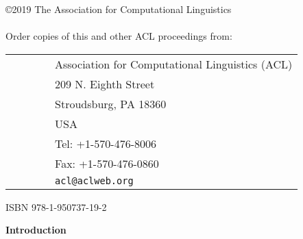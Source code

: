 \documentclass[a4paper,11pt,oneside]{book}
\begin{document}
\vspace*{3.5in}
\large
\noindent
\copyright 2019 The Association for Computational Linguistics\\
\hspace*{6.5mm} \\

\vspace*{0.6in}
\noindent Order copies of this and other ACL proceedings from: \\
\vspace*{3mm}

\begin{tabular}{ll}
\ \ \ \ \ \ & Association for Computational Linguistics (ACL)\\
& 209 N. Eighth Street\\
& Stroudsburg, PA 18360\\
& USA\\
& Tel: +1-570-476-8006\\
& Fax: +1-570-476-0860\\
&{\tt acl@aclweb.org}\\
\end{tabular}

\vspace*{6mm}
\noindent ISBN 978-1-950737-19-2\\


\clearpage



\begin{center}
  {\Large \bf Introduction}
\end{center}

\vspace*{0.5cm}


\end{document}

